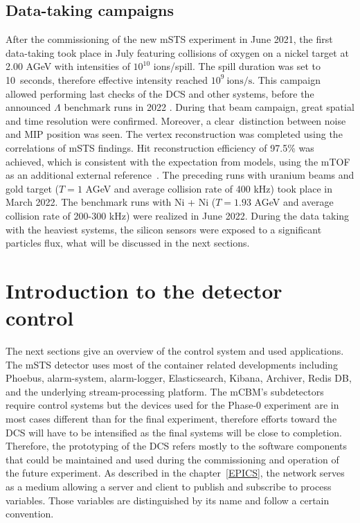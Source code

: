 \subsection{Data-taking campaigns}
After the commissioning of the new \gls{mSTS} experiment in June 2021, the first data-taking took place in July featuring collisions of oxygen on a nickel target at 2.00 AGeV with intensities of $10^{10}$ ions/spill. The spill duration was set to \SI{10}{seconds}, therefore effective intensity reached $10^{9}~\mathrm{ions/s}$. This campaign allowed performing last checks of the \gls{DCS} and other systems, before the announced $\Lambda$ benchmark runs in 2022 \cite{sturm3}. During that beam campaign, great spatial and time resolution were confirmed. Moreover, a clear distinction between noise and MIP position was seen. The vertex reconstruction was completed using the correlations of \gls{mSTS} findings. Hit reconstruction efficiency of 97.5\% was achieved, which is consistent with the expectation from models, using the mTOF as an additional external reference~\cite{dario1}. The preceding runs with uranium beams and gold target ($T = 1$ AGeV and average collision rate of 400 kHz) took place in March 2022. The benchmark runs with Ni + Ni ($T = 1.93$ AGeV and average collision rate of 200-300 kHz) were realized in June 2022. During the data taking with the heaviest systems, the silicon sensors were exposed to a significant particles flux, what will be discussed in the next sections. 
\section{Introduction to the detector control}
The next sections give an overview of the control system and used applications. The \gls{mSTS} detector uses most of the container related developments including Phoebus, alarm-system, alarm-logger, Elasticsearch, Kibana, Archiver, Redis \gls{DB}, and the underlying stream-processing platform. The mCBM's subdetectors require control systems but the devices used for the Phase-0 experiment are in most cases different than for the final experiment, therefore efforts toward the \gls{DCS} will have to be intensified as the final systems will be close to completion. Therefore, the prototyping of the \gls{DCS} refers mostly to the software components that could be maintained and used during the commissioning and operation of the future experiment. As described in the chapter~\ref{EPICS}, the network serves as a medium allowing a server and client to publish and subscribe to process variables. Those variables are distinguished by its name and follow a certain convention.
